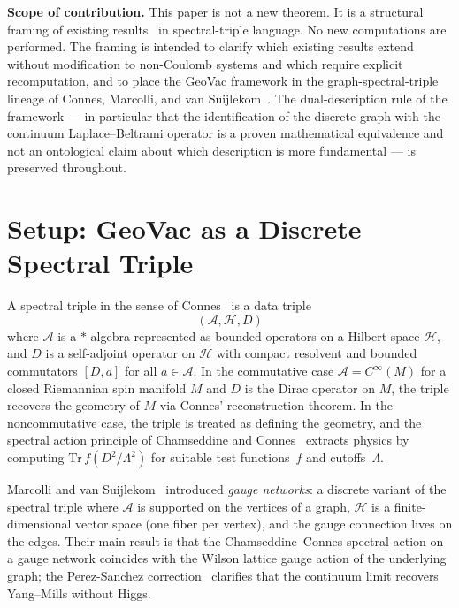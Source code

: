 \documentclass[twocolumn,pra,amsmath,amssymb,superscriptaddress]{revtex4-2}
\begin{document}
\medskip\noindent\textbf{Scope of contribution.}  This paper is not a
new theorem.  It is a structural framing of existing
results~\cite{paper22,paper23,paper24,paper25} in spectral-triple
language.  No new computations are performed.  The framing is
intended to clarify which existing results extend without
modification to non-Coulomb systems and which require explicit
recomputation, and to place the GeoVac framework in the
graph-spectral-triple lineage of Connes, Marcolli, and van
Suijlekom~\cite{connes_book1994,marcolli_vs2014,perez_sanchez2024}.
The dual-description rule of the framework --- in particular that the
identification of the discrete graph with the continuum
Laplace--Beltrami operator is a proven mathematical equivalence and
not an ontological claim about which description is more
fundamental --- is preserved throughout.

\section{Setup: GeoVac as a Discrete Spectral Triple}
\label{sec:setup}

A spectral triple in the sense of Connes~\cite{connes_book1994} is a
data triple
\[
  (\mathcal{A}, \mathcal{H}, D)
\]
where $\mathcal{A}$ is a $*$-algebra represented as bounded
operators on a Hilbert space $\mathcal{H}$, and $D$ is a self-adjoint
operator on $\mathcal{H}$ with compact resolvent and bounded
commutators $[D, a]$ for all $a \in \mathcal{A}$.  In the commutative
case $\mathcal{A} = C^\infty(M)$ for a closed Riemannian spin manifold
$M$ and $D$ is the Dirac operator on $M$, the triple recovers the
geometry of $M$ via Connes' reconstruction theorem.  In the
noncommutative case, the triple is treated as defining the geometry,
and the spectral action principle of Chamseddine and
Connes~\cite{chamseddine_connes1997} extracts physics by computing
$\mathrm{Tr}\, f(D^2/\Lambda^2)$ for suitable test functions~$f$ and
cutoffs~$\Lambda$.

Marcolli and van Suijlekom~\cite{marcolli_vs2014} introduced
\emph{gauge networks}: a discrete variant of the spectral triple
where $\mathcal{A}$ is supported on the vertices of a graph,
$\mathcal{H}$ is a finite-dimensional vector space (one fiber per
vertex), and the gauge connection lives on the edges.  Their main
result is that the Chamseddine--Connes spectral action on a gauge
network coincides with the Wilson lattice gauge action of the
underlying graph; the Perez-Sanchez correction~\cite{perez_sanchez2024}
clarifies that the continuum limit recovers Yang--Mills without
Higgs.
\end{document}
